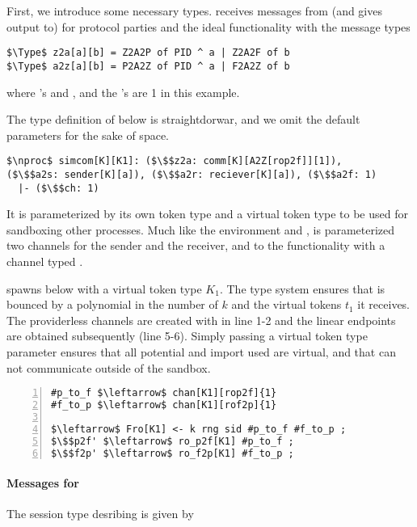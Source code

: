 First, we introduce some necessary types. 
\simcom receives messages from (and gives output to) \Z for protocol parties and the ideal functionality with the message types

\begin{lstlisting}[basicstyle=\footnotesize\BeraMonottFamily, mathescape]
$\Type$ z2a[a][b] = Z2A2P of PID ^ a | Z2A2F of b 
$\Type$ a2z[a][b] = P2A2Z of PID ^ a | F2A2Z of b
\end{lstlisting}
where 's  and , and the 's are 1 in this example. 

The type definition of \simcom below is straightdorwar, and we omit the default parameters for the sake of space.
\begin{lstlisting}[basicstyle=\footnotesize\BeraMonottFamily, mathescape, frame=single]
$\nproc$ simcom[K][K1]: ($\$$z2a: comm[K][A2Z[rop2f]][1]),
($\$$a2s: sender[K][a]), ($\$$a2r: reciever[K][a]), ($\$$a2f: 1) 
  |- ($\$$ch: 1)
\end{lstlisting}
It is parameterized by its own token type  and a virtual token type  to be used for sandboxing other processes.
Much like the environment and \Fcom, \simcom is parameterized  two channels for the sender and the receiver, and to the functionality with a channel typed .

\simcom spawns \Fro below with a virtual token type $K_1$. The type system ensures that \Fro is bounced by a polynomial \GlobalF in the number of $k$ and the virtual tokens $t_1$ it receives.
The providerless channels are created with  in line 1-2 and the linear endpoints are obtained subsequently (line 5-6).
Simply passing a virtual token type parameter ensures that all potential and import used are virtual, and that \Fro can not communicate outside of the sandbox.
\begin{lstlisting}[basicstyle=\footnotesize\BeraMonottFamily, mathescape, frame=single, numbers=left, xleftmargin=2em, xrightmargin=2em]
#p_to_f $\leftarrow$ chan[K1][rop2f]{1}
#f_to_p $\leftarrow$ chan[K1][rof2p]{1}

$\leftarrow$ Fro[K1] <- k rng sid #p_to_f #f_to_p ;
$\$$p2f' $\leftarrow$ ro_p2f[K1] #p_to_f ;
$\$$f2p' $\leftarrow$ ro_f2p[K1] #f_to_p ;
\end{lstlisting}


\paragraph{Messages for \Fro}
The session type desribing \Fro is given by

